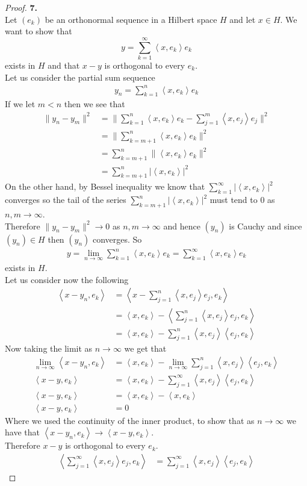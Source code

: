 \documentclass[11pt]{article}
\newcommand{\inprd}[1]{\left\langle{#1}\right\rangle}
\theoremstyle{definition}
\begin{document}
\cleardoublepage
\begin{proof}{\textbf{7.}}\\
Let $(e_k)$ be an orthonormal sequence in a Hilbert space $H$ and let $x\in H$.
We want to show that
$$y = \sum_{k=1}^\infty \inprd{x,e_k}e_k$$
exists in $H$ and that $x -y$ is orthogonal to every $e_k$.
\\
Let us consider the partial sum sequence
\begin{align*}
    y_n = \sum_{k=1}^n \inprd{x,e_k}e_k
\end{align*}
If we let $m < n$ then we see that
\begin{align*}
    \|y_n - y_m\|^2
    &= \bigg\|\sum_{k=1}^n \inprd{x,e_k}e_k - \sum_{j=1}^m \inprd{x,e_j}e_j\bigg\|^2\\
    &= \bigg\|\sum_{k=m+1}^n \inprd{x,e_k}e_k\bigg\|^2\\
    &= \sum_{k=m+1}^n \|\inprd{x,e_k}e_k\|^2\\
    &= \sum_{k=m+1}^n |\inprd{x,e_k}|^2
\end{align*}
On the other hand, by Bessel inequality we know that
$\sum_{k=1}^\infty |\inprd{x,e_k}|^2$ converges so the tail of the series
$\sum_{k=m+1}^n |\inprd{x,e_k}|^2$ must tend to 0 as $n,m \to \infty$.
\\
Therefore $\|y_n - y_m\|^2 \to 0$ as $n,m \to \infty$ and hence $(y_n)$ is
Cauchy and since $(y_n) \in H$ then $(y_n)$ converges. So 
\begin{align*}
    y = \lim_{n\to\infty}\sum_{k=1}^n \inprd{x,e_k}e_k = \sum_{k=1}^\infty \inprd{x,e_k}e_k
\end{align*}
exists in $H$.
\\
Let us consider now the following
\begin{align*}
    \inprd{x - y_n, e_k}
    &= \inprd{x - \sum_{j=1}^n \inprd{x,e_j}e_j, e_k}\\
    &= \inprd{x, e_k} - \inprd{\sum_{j=1}^n \inprd{x,e_j}e_j, e_k}\\
    &= \inprd{x, e_k} - \sum_{j=1}^n \inprd{x,e_j}\inprd{e_j, e_k}
\end{align*}
Now taking the limit as $n \to \infty$ we get that
\begin{align*}
    \lim_{n\to \infty}\inprd{x - y_n, e_k}
    &= \inprd{x, e_k} - \lim_{n\to \infty}\sum_{j=1}^n \inprd{x,e_j}\inprd{e_j, e_k}\\
    \inprd{x - y, e_k}
    &= \inprd{x, e_k} - \sum_{j=1}^\infty \inprd{x,e_j}\inprd{e_j, e_k}\\
    \inprd{x - y, e_k} &= \inprd{x, e_k} - \inprd{x,e_k}\\
    \inprd{x - y, e_k} &= 0
\end{align*}
Where we used the continuity of the inner product, to show that as $n\to\infty$
we have that $\inprd{x - y_n, e_k} \to \inprd{x - y, e_k}$.
\\
Therefore $x -y$ is orthogonal to every $e_k$.
\begin{align*}
    \inprd{\sum_{j=1}^\infty \inprd{x,e_j}e_j, e_k}
    &= \sum_{j=1}^\infty \inprd{x,e_j}\inprd{e_j, e_k}
\end{align*}
\end{proof}
\end{document}
